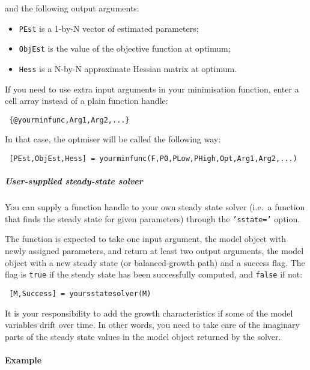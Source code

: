  and the following output arguments:
 
 \begin{itemize}
 \item
   \texttt{PEst} is a 1-by-N vector of estimated parameters;
 \item
   \texttt{ObjEst} is the value of the objective function at optimum;
 \item
   \texttt{Hess} is a N-by-N approximate Hessian matrix at optimum.
 \end{itemize}
 
 If you need to use extra input arguments in your minimisation function,
 enter a cell array instead of a plain function handle:
 
 \begin{verbatim}
 {@yourminfunc,Arg1,Arg2,...}
 \end{verbatim}
 
 In that case, the optmiser will be called the following way:
 
 \begin{verbatim}
 [PEst,ObjEst,Hess] = yourminfunc(F,P0,PLow,PHigh,Opt,Arg1,Arg2,...)
 \end{verbatim}
 
 \subparagraph{User-supplied steady-state solver}
 
 You can supply a function handle to your own steady state solver (i.e.~a
 function that finds the steady state for given parameters) through the
 \texttt{'sstate='} option.
 
 The function is expected to take one input argument, the model object
 with newly assigned parameters, and return at least two output
 arguments, the model object with a new steady state (or balanced-growth
 path) and a success flag. The flag is \texttt{true} if the steady state
 has been successfully computed, and \texttt{false} if not:
 
 \begin{verbatim}
 [M,Success] = yoursstatesolver(M)
 \end{verbatim}
 
 It is your responsibility to add the growth characteristics if some of
 the model variables drift over time. In other words, you need to take
 care of the imaginary parts of the steady state values in the model
 object returned by the solver.
 
 \paragraph{Example}


